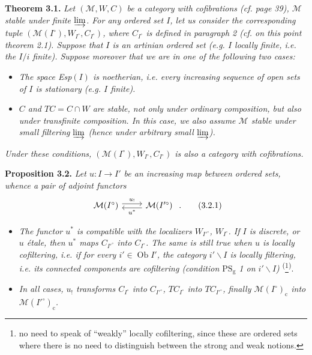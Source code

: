 \textbf{Theorem 3.1.} \textit{Let $(\mathcal{M},W,C)$ be a category with cofibrations (cf. page \textup{39}), $\mathcal{M}$ stable under finite $\varinjlim$. For any ordered set $I$, let us consider the corresponding tuple $(\mathcal{M}(I^\circ),W_{I^\circ},C_{I^\circ})$, where $C_{I^\circ}$ is defined in paragraph \textup{2} (cf. on this point theorem \textup{2.1}). Suppose that $I$ is an \textup{artinian} ordered set (e.g. $I$ locally finite, i.e. the $I/i$ finite). Suppose moreover that we are in one of the following two cases:} %
\begin{itemize}[leftmargin=2.5em]
\item[a)] \textit{The space \textup{Esp}$(I)$ is noetherian, i.e. every increasing sequence of open sets of $I$ is stationary (e.g. $I$ finite).}
\item[b)] \textit{$C$ and $TC=C\cap W$ are stable, not only under ordinary composition, but also under transfinite composition. In this case, we also assume $\mathcal{M}$ stable under small filtering $\varinjlim$ (hence under arbitrary small $\varinjlim$).}
\end{itemize}
\textit{Under these conditions, $(\mathcal{M}(I^\circ),W_{I^\circ},C_{I^\circ})$ is also a category with cofibrations.}

\textbf{Proposition 3.2.} \textit{Let $u:I\longrightarrow I'$ be an increasing map between ordered sets, whence a pair of adjoint functors}
\[
\begin{tikzcd}
\mathcal{M}(I^\circ) \arrow[r, shift left, "u_{!}"] & \mathcal{M}(I'^\circ) \arrow[l, shift left, "u^*"]
\end{tikzcd}\ .
\tag*{(3.2.1)}
\]
\begin{itemize}[leftmargin=2.5em]
\item[a)] \textit{The functor $u^*$ is compatible with the localizers $W_{I'^\circ}$, $W_{I^\circ}$. If $I$ is discrete, or $u$ étale, then $u^*$ maps $C_{I'^\circ}$ into $C_{I^\circ}$. The same is still true when $u$ is locally cofiltering, i.e. if for every $i'\in\operatorname{Ob}I'$, the category $i'\backslash I$ is locally filtering, i.e. its connected components are cofiltering (condition $\mathrm{PS}_{\mathrm{g}}$ \textup{1} on $i'\backslash I$)} \textsuperscript{(}\footnote[16]{no need to speak of ``weakly'' locally cofiltering, since these are ordered sets where there is no need to distinguish between the strong and weak notions.}\textsuperscript{)}.
\item[b)] \textit{In all cases, $u_!$ transforms $C_{I^\circ}$ into $C_{I'^\circ}$, $TC_{I^\circ}$ into $TC_{I'^\circ}$, finally $\mathcal{M}(I^\circ)_{\mathrm{c}}$ into $\mathcal{M}(I'^\circ)_{\mathrm{c}}$.}
\end{itemize}

